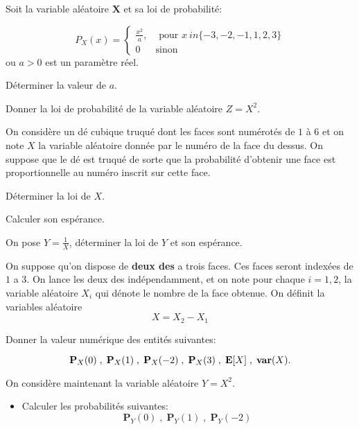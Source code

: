 \documentclass[11pt,largemargins]{homework}
\renewcommand{\P}{\mathbf{P}}
\newcommand{\E}{\mathbf{E}}
\newcommand{\var}{\text{\textbf{var}}}
\begin{document}
\maketitle


Soit la variable aléatoire $\mathbf{X}$  et sa loi de probabilité:

\begin{equation}
  P_X(x) = \begin{cases}
    \frac{x^2}{a},& \text{ pour } x \ in \{-3,-2,-1,1,2,3\}\\[4pt]
    0             & \text{sinon}
  \end{cases}
\end{equation}
ou $a > 0$ est un paramètre réel.

\begin{arabicparts}
    \item Déterminer la valeur de $a$.
    \item Donner la loi de probabilité de la variable aléatoire $Z = X^2$.
\end{arabicparts}

On considère un dé cubique truqué dont les faces sont numérotés de $1$ à $6$ et
on note $X$ la variable aléatoire donnée par le numéro de la face du dessus. On suppose que le dé est truqué de sorte que la probabilité d'obtenir une face est proportionnelle au numéro inscrit sur cette face.


\begin{arabicparts}
\item Déterminer la loi de $X$.
\item Calculer son espérance.
\item On pose $Y = \frac{1}{X}$, déterminer la loi de $Y$ et son espérance.
  
\end{arabicparts}



On suppose qu'on dispose de \textbf{deux des} a trois faces. Ces faces seront
indexées de $1$ a $3$. On lance les deux des indépendamment, et on note pour
chaque $i=1,2$,  la variable aléatoire $X_i$ qui dénote le nombre de la face
obtenue. On définit la variables aléatoire
$$
X = X_2 - X_1
$$


\begin{arabicparts}
    \item Donner la valeur numérique des entités suivantes:

      $$
      \P_X(0)\;,\; \P_X(1)\;,\;\P_X(-2)\;,\; \P_X(3)\;,\;\E[X]\;,\;\var(X).
      $$
    \item On considère maintenant la variable aléatoire $Y=X^2$.
      \begin{itemize}
        \item Calculer les probabilités suivantes:
          $$
            \P_Y(0)\;,\; \P_Y(1)\;,\;\P_Y(-2)\
          $$
      \end{itemize}
\end{arabicparts}
\end{document}
